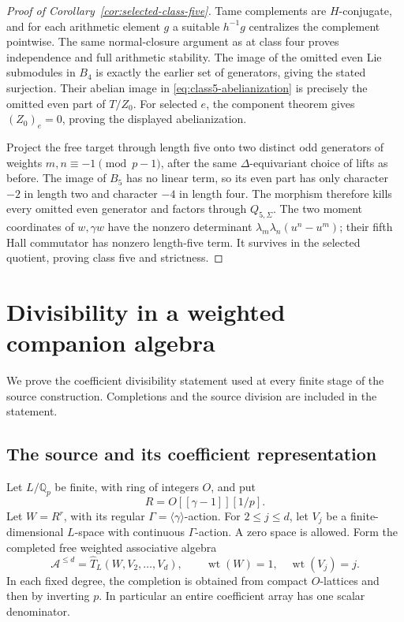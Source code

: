 \documentclass[11pt]{article}
\theoremstyle{definition}\newtheorem{definition}[theorem]{Definition}
\begin{document}
\begin{proof}[Proof of Corollary~\ref{cor:selected-class-five}]
Tame complements are $H$-conjugate, and for each
arithmetic element $g$ a suitable $h^{-1}g$ centralizes
the complement pointwise. The same normal-closure
argument as at class four proves independence and
full arithmetic stability. The image of the omitted
even Lie submodules in $B_4$ is exactly the earlier
set of generators, giving the stated surjection.
Their abelian image in \eqref{eq:class5-abelianization}
is precisely the omitted even part of $T/Z_0$.
For selected $e$, the component theorem gives
$(Z_0)_e=0$, proving the displayed abelianization.

Project the free target through length five
onto two distinct odd generators of weights
$m,n\equiv-1\pmod{p-1}$, after the same
$\Delta$-equivariant choice of lifts as before.
The image of $B_5$ has no linear term, so its even
part has only character $-2$ in length two and
character $-4$ in length four. The morphism therefore
kills every omitted even generator and factors
through $Q_{5,\Sigma}$. The two moment coordinates
of $w,\gamma w$ have the nonzero determinant
$\lambda_m\lambda_n(u^n-u^m)$; their fifth Hall
commutator has nonzero length-five term. It survives
in the selected quotient, proving class five and
strictness.
\end{proof}

\section{Divisibility in a weighted companion algebra}
\label{sec:weighted-companion-saturation}

We prove the coefficient divisibility statement used at every finite
stage of the source construction.  Completions and the source division
are included in the statement.

\subsection{The source and its coefficient representation}

Let \(L/\mathbb Q_p\) be finite, with ring of integers \(O\), and put
\[
 R=O[[\gamma-1]][1/p].
\]
Let \(W=R^r\), with its regular \(\Gamma=\langle\gamma\rangle\)-action.
For \(2\leq j\leq d\), let \(V_j\) be a finite-dimensional
\(L\)-space with continuous \(\Gamma\)-action.  A zero space is allowed.
Form the completed free weighted associative algebra
\[
 \mathcal A^{\leq d}
   =\widehat T_L(W,V_2,\ldots,V_d),
 \qquad \operatorname{wt}(W)=1,\quad
 \operatorname{wt}(V_j)=j.
\]
In each fixed degree, the completion is obtained from compact
\(O\)-lattices and then by inverting \(p\).  In particular an entire
coefficient array has one scalar denominator.
\end{document}
